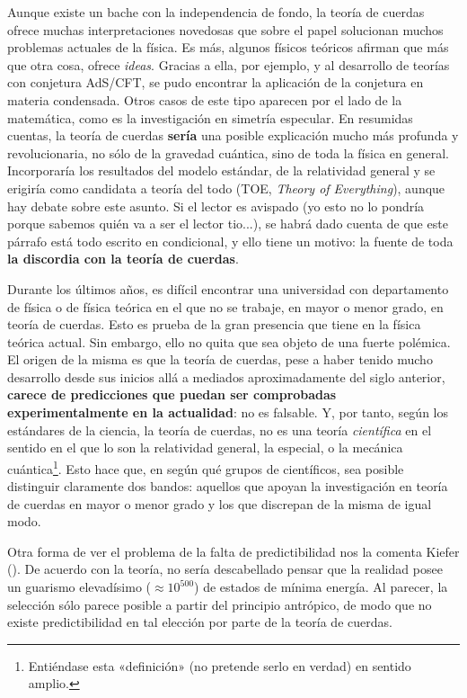 \documentclass[11pt,a4paper,titlepage]{article}
\begin{document}
Aunque existe un bache con la independencia de fondo, la teoría de cuerdas ofrece muchas interpretaciones novedosas que sobre el papel solucionan muchos problemas actuales de la física. Es más, algunos físicos teóricos afirman que más que otra cosa, ofrece \textit{ideas}. Gracias a ella, por ejemplo, y al desarrollo de teorías con conjetura AdS/CFT, se pudo encontrar la aplicación de la conjetura en materia condensada. Otros casos de este tipo aparecen por el lado de la matemática, como es la investigación en simetría especular. En resumidas cuentas, la teoría de cuerdas \textbf{sería} una posible explicación mucho más profunda y revolucionaria, no sólo de la gravedad cuántica, sino de toda la física en general. Incorporaría los resultados del modelo estándar, de la relatividad general y se erigiría como candidata a teoría del todo (TOE, \textit{Theory of Everything}), aunque hay debate sobre este asunto. {\color{red}Si el lector es avispado} (yo esto no lo pondría porque sabemos quién va a ser el lector tio...), se habrá dado cuenta de que este párrafo está todo escrito en condicional, y ello tiene un motivo: la fuente de toda \textbf{la discordia con la teoría de cuerdas}.

Durante los últimos años, es difícil encontrar una universidad con departamento de física o de física teórica en el que no se trabaje, en mayor o menor grado, en teoría de cuerdas. Esto es prueba de la gran presencia que tiene en la física teórica actual. Sin embargo, ello no quita que sea objeto de una fuerte polémica. El origen de la misma es que la teoría de cuerdas, pese a haber tenido mucho desarrollo desde sus inicios allá a mediados aproximadamente del siglo anterior, \textbf{carece de predicciones que puedan ser comprobadas experimentalmente en la actualidad}: no es falsable. Y, por tanto, según los estándares de la ciencia, la teoría de cuerdas, no es una teoría \textit{científica} en el sentido en el que lo son la relatividad general, la especial, o la mecánica cuántica\footnote{Entiéndase esta «definición» (no pretende serlo en verdad) en sentido amplio.}. Esto hace que, en según qué grupos de científicos, sea posible distinguir claramente dos bandos: aquellos que apoyan la investigación en teoría de cuerdas en mayor o menor grado y los que discrepan de la misma de igual modo.

Otra forma de ver el problema de la falta de predictibilidad nos la comenta Kiefer (\cite[p.~8]{paper_osorio}). De acuerdo con la teoría, no sería descabellado pensar que la realidad posee un guarismo elevadísimo ($\approx10^{500}$) de estados de mínima energía. Al parecer, la selección sólo parece posible a partir del principio antrópico, de modo que no existe predictibilidad en tal elección por parte de la teoría de cuerdas.
\end{document}

